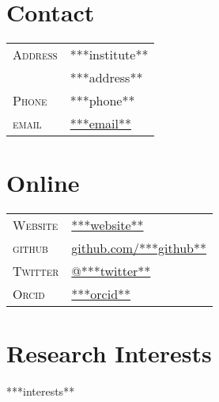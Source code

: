 \documentclass[10pt]{article}
\begin{document}

\par{\bigskip\par}

\begin{multicols}{2}
\setlength{\parskip}{0pt}

\section{Contact}
\begin{tabularx}{\linewidth}{@{}l X@{}}
  \textsc{Address} & \small{***institute**} \\
                   & \small{***address**} \\
  \textsc{Phone}   & \small{***phone**}\\
  \textsc{email}   & \href{mailto:***email**}{***email**} \\
\end{tabularx}

\columnbreak

\section{Online}
\begin{tabularx}{\linewidth}{@{}l X@{}}
  \textsc{Website}  & \href{***websiteescaped**}{***website**} \\
  \textsc{github}   & \href{http://www.github.com/***github**}{github.com/***github**}\\
  \textsc{Twitter}  & \href{https://twitter.com/***twitter**}{@***twitter**} \\
  \textsc{Orcid}    & \href{http://orcid.org/***orcid**}{***orcid**} \\
\end{tabularx}

\end{multicols}

\section{Research Interests}

***interests**


\newcommand{\degree}[6]{\textsc{#1} & #2 in \textsc{#3} & \textbf{#4}\\
                        & \ifthenelse{\equal{#5}{}}{\small ~}{\small Advisors: #5} & \\
                        & \ifthenelse{\equal{#6}{}}{~}{\footnotesize Dissertation: ``#6''} & \\[1ex]
                        }
\end{document}
